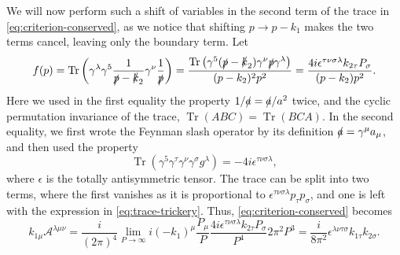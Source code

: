 We will now perform such a shift of variables in the second term of the trace in \cref{eq:criterion-conserved}, as we notice that shifting $p \to p-k_1$ makes the two terms cancel, leaving only the boundary term.
Let
\begin{equation}
  \label{eq:trace-trickery}
  f(p) = \operatorname{Tr}\left(
  \gamma ^{\lambda }\gamma ^5 \frac{1}{\slashed{p} - \slashed{k}_2} \gamma ^{\nu } \frac{1}{\slashed{p}}
  \right)
  = \frac{\operatorname{Tr}\left(
  \gamma ^5 (\slashed{p}-\slashed{k}_2) \gamma ^{\nu }\slashed{p}\gamma ^{\lambda }
\right)}{
(p-k_2)^2 p^2}
= \frac{{4 i \epsilon ^{\tau \nu \sigma \lambda } k_{2\tau }P_{\sigma }}}{(p-k_2) p^2}.
\end{equation}
Here we used in the first equality the property $1 /\slashed{a} = \slashed{a} /a^2$ twice, and the cyclic permutation invariance of the trace, $\operatorname{Tr}(ABC) = \operatorname{Tr}(BCA)$.
In the second equality, we first wrote the Feynman slash operator by its definition $\slashed{a}=\gamma ^{\mu }a_{\mu }$, and then used the property
\begin{equation}
  \label{eq:trace-gamma}
  \operatorname{Tr}(\gamma ^5\gamma ^{\tau }\gamma ^{\nu }\gamma ^{\sigma }g^{\lambda }) = -4i\epsilon ^{\tau \nu \sigma \lambda },
\end{equation}
where $\epsilon $ is the totally antisymmetric tensor.
The trace can be split into two terms, where the first vanishes as it is proportional to $\epsilon ^{\tau \nu \sigma \lambda }p_{\tau }p_{\sigma }$, and one is left with the expression in \cref{eq:trace-trickery}.
Thus, \cref{eq:criterion-conserved} becomes
\begin{equation}
  \label{eq:criterion-conserved-simp}
  k_{1\mu } \mathcal{A}^{\lambda \mu \nu } =
  \frac{i}{(2\pi)^{4}} \lim_{P\to \infty } i(-k_1)^{\mu } \frac{P_{\mu }}{P}
  \frac{{4 i \epsilon ^{\tau \nu \sigma \lambda } k_{2\tau } P_{\sigma }}}{P^{4}} 2\pi^2 P^3
  = \frac{i}{8\pi^2} \epsilon ^{\lambda \nu \tau \sigma } k_{1\tau }k_{2\sigma }.
\end{equation}

